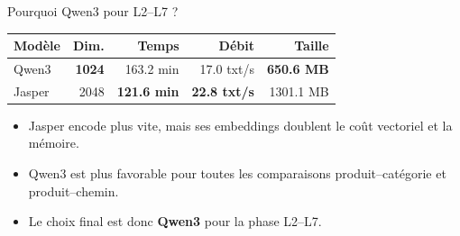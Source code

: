 \documentclass[11pt,aspectratio=169]{beamer}
\begin{document}
\begin{frame}{Pourquoi Qwen3 pour L2--L7 ?}
\small
\begin{table}
\centering
\scriptsize
\renewcommand{\arraystretch}{1.18}
\begin{tabular}{lrrrr}
\toprule
\textbf{Modèle} & \textbf{Dim.} & \textbf{Temps} & \textbf{Débit} & \textbf{Taille} \\
\midrule
Qwen3 & \textbf{1024} & 163.2 min & 17.0 txt/s & \textbf{650.6 MB} \\
Jasper & 2048 & \textbf{121.6 min} & \textbf{22.8 txt/s} & 1301.1 MB \\
\bottomrule
\end{tabular}
\end{table}

\vspace{0.25cm}

\begin{block}{}
\begin{itemize}
    \item Jasper encode plus vite, mais ses embeddings doublent le coût vectoriel et la mémoire.
    \item Qwen3 est plus favorable pour toutes les comparaisons produit--catégorie et produit--chemin.
    \item Le choix final est donc \textbf{Qwen3} pour la phase L2--L7.
\end{itemize}
\end{block}
\end{frame}
\end{document}
